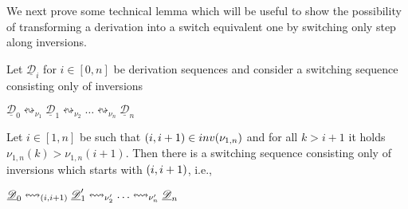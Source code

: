 \documentclass[a4paper,UKenglish,cleveref,pdftex, thm-restate,numberwithinsect,anonymous]{lipics}
\newcommand{\interval}[2][1]{\ensuremath{[{#1},{#2}]}}
\newcommand{\dder}[1]{\mathscr{#1}}
\newcommand{\der}[1]{\underline{\dder{#1}}}
\newcommand{\inv}[1]{\mathsf{inv}({#1})}
\newcommand{\shift}[1]{\ensuremath{\mathrel{{\leftrightsquigarrow}_{#1}}}}
\begin{document}
We next prove some technical lemma which will be useful to show the
possibility of transforming a derivation into a switch equivalent one
by switching only step along inversions.



\begin{lemma}
  \label{le:switchA}
  Let $\der{D}_i$ for $i \in \interval[0]{n}$ be derivation sequences
  and consider a switching sequence consisting only of inversions
  \begin{center}
    $\der{D}_0 \shift{\nu_1} \der{D}_1 \shift{\nu_2} \ldots
    \shift{\nu_n} \der{D}_n$
  \end{center}
  Let $i \in \interval{n}$ be such that
  $\transp{i} \in \inv{\nu_{1,n}}$ and for all $k > i+1$ it holds
  $\nu_{1,n}(k) > \nu_{1,n}(i+1)$.  Then there is a switching sequence
  consisting only of inversions which starts with $\transp{i}$, i.e.,
  \begin{center}
    $\der{D}_0 \shift{\transp{i}} \der{D}_1' \shift{\nu_2'} \ldots
    \shift{\nu_n'} \der{D}_n$
  \end{center}
\end{lemma}
\end{document}
